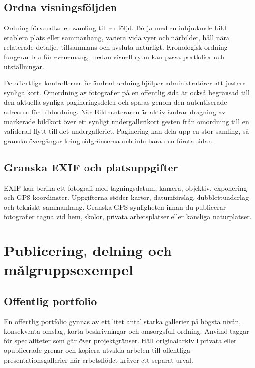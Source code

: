 \documentclass[11pt,a4paper]{article}
\begin{document}
\subsection{Ordna visningsföljden}

Ordning förvandlar en samling till en följd. Börja med en inbjudande bild,
etablera plats eller sammanhang, variera vida vyer och närbilder, håll nära
relaterade detaljer tillsammans och avsluta naturligt. Kronologisk ordning
fungerar bra för evenemang, medan visuell rytm kan passa portfolior och
utställningar.

De offentliga kontrollerna för ändrad ordning hjälper administratörer att
justera synliga kort. Omordning av fotografier på en offentlig sida är också
begränsad till den aktuella synliga pagineringsdelen och sparas genom den
autentiserade adressen för bildordning. När Bildhanteraren är aktiv ändrar
dragning av markerade bildkort över ett synligt undergallerikort gesten från
omordning till en validerad flytt till det undergalleriet. Paginering kan dela
upp en stor samling, så granska övergångar kring sidgränserna och inte bara den
första sidan.

\subsection{Granska EXIF och platsuppgifter}

EXIF kan berika ett fotografi med tagningsdatum, kamera, objektiv, exponering
och GPS-koordinater. Uppgifterna stöder kartor, datumförslag, dubblettunderlag
och tekniskt sammanhang. Granska GPS-synligheten innan du publicerar fotografier
tagna vid hem, skolor, privata arbetsplatser eller känsliga naturplatser.

\section{Publicering, delning och målgruppsexempel}
\label{sec:audiences}

\subsection{Offentlig portfolio}

En offentlig portfolio gynnas av ett litet antal starka gallerier på högsta
nivån, konsekventa omslag, korta beskrivningar och omsorgsfull ordning. Använd
taggar för specialiteter som går över projektgränser. Håll originalarkiv i
privata eller opublicerade grenar och kopiera utvalda arbeten till offentliga
presentationsgallerier när arbetsflödet kräver ett separat urval.
\end{document}
